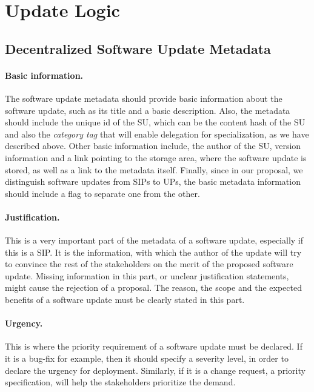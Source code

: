\section{Update Logic} \label{appxupdlogic}

\subsection{Decentralized Software Update Metadata} \label{appxmetadata}
\paragraph{Basic information.}The software update metadata should provide basic information about the software update, such as its title and a basic description. Also, the metadata should include the unique id of the SU, which can be the content hash of the SU and also the \emph{category tag} that will enable delegation for specialization, as we have described above. Other basic information include, the author of the SU, version information and a link pointing to the storage area, where the software update is stored, as well as a link to the metadata itself. Finally, since in our proposal, we distinguish software updates from SIPs to UPs, the basic metadata information should include a flag to separate one from the other.
\paragraph{Justification.} This is a very important part of the metadata of a software update, especially if this is a SIP. It is the information, with which the author of the update will try to convince the rest of the stakeholders on the merit of the proposed software update. Missing information in this part, or unclear justification statements, might cause the rejection of a proposal. The reason, the scope and the expected benefits of a software update must be clearly stated in this part.
\paragraph{Urgency.} This is where the priority requirement of a software update must be declared. If it is a bug-fix for example, then it should specify a severity level, in order to declare the urgency for deployment. Similarly, if it is a change request, a priority specification, will help the stakeholders prioritize the demand.
